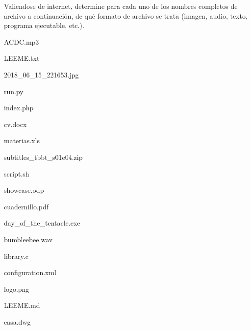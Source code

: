 \begin{exercise}
Valiendose de internet, determine para cada uno de los nombres completos de
archivo a continuación, de qué formato de archivo se trata (imagen, audio, texto,
programa ejecutable, etc.).

\begin{enumerate}[a)]
    \begin{minipage}{0.45\textwidth}
        \item ACDC.mp3
        \item LEEME.txt
        \item 2018\_06\_15\_221653.jpg
        \item run.py
        \item index.php
        \item cv.docx
        \item materias.xls
        \item subtitles\_tbbt\_s01e04.zip
        \item script.sh
    \end{minipage}
    \begin{minipage}{0.45\textwidth}
        \item showcase.odp
        \item cuadernillo.pdf
        \item day\_of\_the\_tentacle.exe
        \item bumbleebee.wav
        \item library.c
        \item configuration.xml
        \item logo.png
        \item LEEME.md
        \item casa.dwg
    \end{minipage}
\end{enumerate}

\end{exercise}

